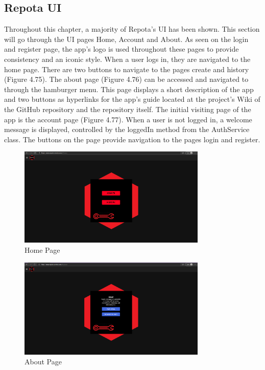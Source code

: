 \subsection{Repota UI}
Throughout this chapter, a majority of Repota's UI has been shown. This section will go through the UI pages Home, Account and About. As seen on the login and register page, the app's logo is used throughout these pages to provide consistency and an iconic style. When a user logs in, they are navigated to the home page. There are two buttons to navigate to the pages create and history (Figure 4.75). The about page (Figure 4.76) can be accessed and navigated to through the hamburger menu. This page displays a short description of the app and two buttons as hyperlinks for the app's guide located at the project's Wiki of the GitHub repository and the repository itself. The initial visiting page of the app is the account page (Figure 4.77). When a user is not logged in, a welcome message is displayed, controlled by the loggedIn method from the AuthService class. The buttons on the page provide navigation to the pages login and register. 

\begin{figure}[H]
    \centering
    \caption{Home Page}
    \label{image:homePage}
    \includegraphics[width=0.8\textwidth]{images/repota/UI/home-page.png}
\end{figure}

\begin{figure}[H]
    \centering
    \caption{About Page}
    \label{image:aboutPage}
    \includegraphics[width=0.8\textwidth]{images/repota/UI/about.png}
\end{figure}

